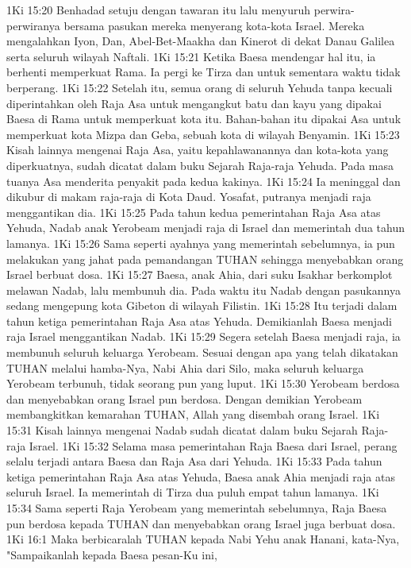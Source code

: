 1Ki 15:20  Benhadad setuju dengan tawaran itu lalu menyuruh perwira-perwiranya bersama pasukan mereka menyerang kota-kota Israel. Mereka mengalahkan Iyon, Dan, Abel-Bet-Maakha dan Kinerot di dekat Danau Galilea serta seluruh wilayah Naftali.
1Ki 15:21  Ketika Baesa mendengar hal itu, ia berhenti memperkuat Rama. Ia pergi ke Tirza dan untuk sementara waktu tidak berperang.
1Ki 15:22  Setelah itu, semua orang di seluruh Yehuda tanpa kecuali diperintahkan oleh Raja Asa untuk mengangkut batu dan kayu yang dipakai Baesa di Rama untuk memperkuat kota itu. Bahan-bahan itu dipakai Asa untuk memperkuat kota Mizpa dan Geba, sebuah kota di wilayah Benyamin.
1Ki 15:23  Kisah lainnya mengenai Raja Asa, yaitu kepahlawanannya dan kota-kota yang diperkuatnya, sudah dicatat dalam buku Sejarah Raja-raja Yehuda. Pada masa tuanya Asa menderita penyakit pada kedua kakinya.
1Ki 15:24  Ia meninggal dan dikubur di makam raja-raja di Kota Daud. Yosafat, putranya menjadi raja menggantikan dia.
1Ki 15:25  Pada tahun kedua pemerintahan Raja Asa atas Yehuda, Nadab anak Yerobeam menjadi raja di Israel dan memerintah dua tahun lamanya.
1Ki 15:26  Sama seperti ayahnya yang memerintah sebelumnya, ia pun melakukan yang jahat pada pemandangan TUHAN sehingga menyebabkan orang Israel berbuat dosa.
1Ki 15:27  Baesa, anak Ahia, dari suku Isakhar berkomplot melawan Nadab, lalu membunuh dia. Pada waktu itu Nadab dengan pasukannya sedang mengepung kota Gibeton di wilayah Filistin.
1Ki 15:28  Itu terjadi dalam tahun ketiga pemerintahan Raja Asa atas Yehuda. Demikianlah Baesa menjadi raja Israel menggantikan Nadab.
1Ki 15:29  Segera setelah Baesa menjadi raja, ia membunuh seluruh keluarga Yerobeam. Sesuai dengan apa yang telah dikatakan TUHAN melalui hamba-Nya, Nabi Ahia dari Silo, maka seluruh keluarga Yerobeam terbunuh, tidak seorang pun yang luput.
1Ki 15:30  Yerobeam berdosa dan menyebabkan orang Israel pun berdosa. Dengan demikian Yerobeam membangkitkan kemarahan TUHAN, Allah yang disembah orang Israel.
1Ki 15:31  Kisah lainnya mengenai Nadab sudah dicatat dalam buku Sejarah Raja-raja Israel.
1Ki 15:32  Selama masa pemerintahan Raja Baesa dari Israel, perang selalu terjadi antara Baesa dan Raja Asa dari Yehuda.
1Ki 15:33  Pada tahun ketiga pemerintahan Raja Asa atas Yehuda, Baesa anak Ahia menjadi raja atas seluruh Israel. Ia memerintah di Tirza dua puluh empat tahun lamanya.
1Ki 15:34  Sama seperti Raja Yerobeam yang memerintah sebelumnya, Raja Baesa pun berdosa kepada TUHAN dan menyebabkan orang Israel juga berbuat dosa.
1Ki 16:1  Maka berbicaralah TUHAN kepada Nabi Yehu anak Hanani, kata-Nya, "Sampaikanlah kepada Baesa pesan-Ku ini,

